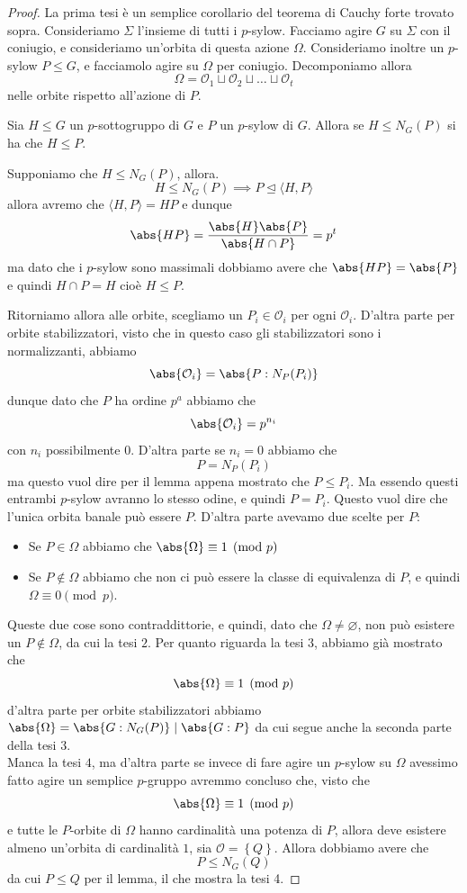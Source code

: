 \documentclass[11pt]{scrartcl}
\newcommand{\eset}{\varnothing}
\newcommand{\normal}{\mathrel{\unlhd}}
\begin{document}
	 \begin{proof}
	 	La prima tesi è un semplice corollario del teorema di Cauchy forte trovato sopra.
	 	Consideriamo $\Sigma$ l'insieme di tutti i $p$-sylow. Facciamo agire $G$ su $\Sigma$ con il coniugio, e consideriamo un'orbita di questa azione $\Omega$. Consideriamo inoltre un $p$-sylow $P\le G$, e facciamolo agire su $\Omega$ per coniugio. Decomponiamo allora
	 	$$\Omega=\mathcal{O}_1\sqcup \mathcal{O}_2 \sqcup \dots \sqcup \mathcal{O}_t$$
	 	nelle orbite rispetto all'azione di $P$.
	 	\begin{claim}
	 		Sia $H\le G$ un $p$-sottogruppo di $G$ e $P$ un $p$-sylow di $G$. Allora
	 		se $H\le N_G(P)$ si ha che $H\le P$.
	 	\end{claim}
	 	\begin{subproof}[Sottodimostrazione]
	 		Supponiamo che $H\le N_G(P)$, allora.
	 		$$H\le N_G(P)\implies P \normal \langle H,P\rangle$$ 
	 		allora avremo che $\langle H,P\rangle = HP$ e dunque
	 		$$\abs{HP}=\frac{\abs{H}\abs{P}}{\abs{H\cap P}}=p^{t}$$
	 		ma dato che i $p$-sylow sono massimali dobbiamo avere che $\abs{HP}=\abs{P}$ e quindi $H\cap P = H$ cioè $H\le P$.
	 	\end{subproof}
	 	Ritorniamo allora alle orbite, scegliamo un $P_i\in \mathcal{O}_i$ per ogni $\mathcal{O}_i$. D'altra parte per orbite stabilizzatori, visto che in questo caso gli stabilizzatori sono i normalizzanti, abbiamo
	 	$$\abs{\mathcal{O}_i}=\abs{P:N_P(P_i)}$$
	 	dunque dato che $P$ ha ordine $p^a$ abbiamo che
	 	$$\abs{\mathcal{O}_i}=p^{n_i}$$
	 	con $n_i$ possibilmente $0$. D'altra parte se $n_i=0$ abbiamo che
	 	$$P=N_P(P_i)$$
	 	ma questo vuol dire per il lemma appena mostrato che $P\le P_i$. Ma essendo questi entrambi $p$-sylow avranno lo stesso odine, e quindi $P=P_i$. Questo vuol dire che l'unica orbita banale può essere $P$. D'altra parte avevamo due scelte per $P$:
	 	\begin{itemize}
	 		\item Se $P\in\Omega$ abbiamo che $\abs{\Omega}\equiv 1 \pmod{p}$
	 		\item Se $P\not\in \Omega$ abbiamo che non ci può essere la classe di equivalenza di $P$, e quindi $\Omega \equiv 0 \pmod{p}$. 
	 	\end{itemize} 
	 	Queste due cose sono contraddittorie, e quindi, dato che $\Omega\ne \eset$, non può esistere un $P\not\in\Omega$, da cui la tesi $2$.
	 	Per quanto riguarda la tesi $3$, abbiamo già mostrato che
	 	$$\abs{\Omega}\equiv 1 \pmod{p}$$
	 	d'altra parte per orbite stabilizzatori abbiamo $\abs{\Omega}=\abs{G:N_G(P)}\mid \abs{G:P}$ da cui segue anche la seconda parte della tesi $3$. \\
	 	Manca la tesi $4$, ma d'altra parte se invece di fare agire un $p$-sylow su $\Omega$ avessimo fatto agire un semplice $p$-gruppo avremmo concluso che, visto che $$\abs{\Omega}\equiv 1 \pmod{p}$$
	 	e tutte le $P$-orbite di $\Omega$ hanno cardinalità una potenza di $P$, allora deve esistere almeno un'orbita di cardinalità $1$, sia $\mathcal{O}=\left\{Q\right\}$. Allora dobbiamo avere che 
	 	$$P\le N_G(Q)$$
	 	da cui $P\le Q$ per il lemma, il che mostra la tesi 4.
	 \end{proof}
\end{document}
